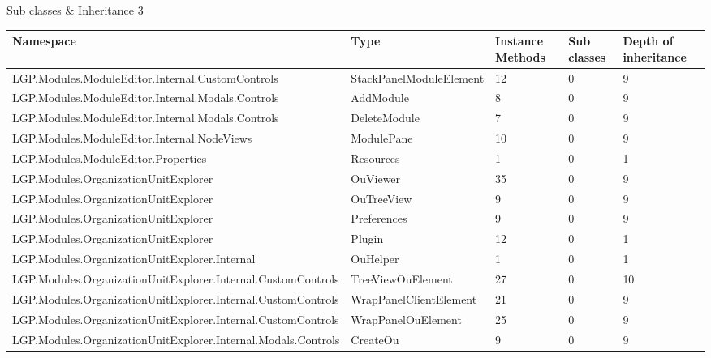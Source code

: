 \begin{table}[h!t]
				\caption{Sub classes \& Inheritance 3}			
				\label{tab:SubclassesInheritance3}
				
			\end{table}
			
		\newpage
			
			\begin{table}[h!t]
				\footnotesize{\begin{tabular}{ | p{82mm} | p{33mm} | p{10mm} | p{10mm} | p{10mm}  | }	
																								\hline
				Namespace & Type  & Instance Methods & Sub classes & Depth of inheritance  \\ \hline		
				
				LGP.Modules.ModuleEditor.Internal.CustomControls & StackPanelModuleElement & 12    & 0     & 9  \\ \hline
				LGP.Modules.ModuleEditor.Internal.Modals.Controls & AddModule & 8     & 0     & 9  \\ \hline
				LGP.Modules.ModuleEditor.Internal.Modals.Controls & DeleteModule & 7     & 0     & 9  \\ \hline
				LGP.Modules.ModuleEditor.Internal.NodeViews & ModulePane & 10    & 0     & 9  \\ \hline
				LGP.Modules.ModuleEditor.Properties & Resources & 1     & 0     & 1  \\ \hline
				LGP.Modules.OrganizationUnitExplorer & OuViewer & \cellcolor{ored}35    & 0     & 9  \\ \hline
				LGP.Modules.OrganizationUnitExplorer & OuTreeView & 9     & 0     & 9  \\ \hline
				LGP.Modules.OrganizationUnitExplorer & Preferences & 9     & 0     & 9  \\ \hline
				LGP.Modules.OrganizationUnitExplorer & Plugin & 12    & 0     & 1  \\ \hline
				LGP.Modules.OrganizationUnitExplorer.Internal & OuHelper & 1     & 0     & 1  \\ \hline
				LGP.Modules.OrganizationUnitExplorer.Internal.CustomControls & TreeViewOuElement & \cellcolor{ored}27    & 0     & \cellcolor{ored} 10 \\ \hline
				LGP.Modules.OrganizationUnitExplorer.Internal.CustomControls & WrapPanelClientElement & \cellcolor{ored}21    & 0     & 9  \\ \hline
				LGP.Modules.OrganizationUnitExplorer.Internal.CustomControls & WrapPanelOuElement & \cellcolor{ored}25    & 0     & 9  \\ \hline
				LGP.Modules.OrganizationUnitExplorer.Internal.Modals.Controls & CreateOu & 9     & 0     & 9  \\ \hline

\end{tabular}}
\end{table}
